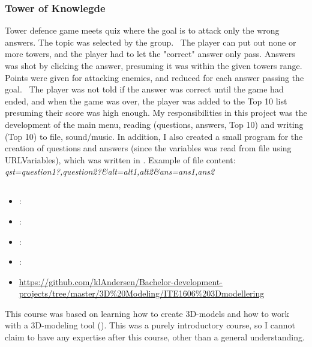 \subsubsection{Tower of Knowlegde}
\label{sec:tower_of_knowledge}
Tower defence game meets quiz where the goal is to attack only the wrong answers. 
The topic was selected by the group. 
The player can put out none or more towers, and the player had to let the "correct" answer only pass.
\vspace{0.5em}\newline
Answers was shot by clicking the answer, presuming it was within the given towers range. 
Points were given for attacking enemies, and reduced for each answer passing the goal. 
The player was not told if the answer was correct until the game had ended, and when the game was over, the player was added to the Top 10 list presuming their score was high enough. 
My responsibilities in this project was the development of the main menu, reading (questions, answers, Top 10) and writing (Top 10) to file, sound/music.
\vspace{0.5em}\newline
In addition, I also created a small program for the creation of questions and answers (since the variables was read from file using URLVariables), which was written in .
\vspace{0.5em}\newline
Example of file content: \\
\textit{qst=question1?,question2?\&alt=alt1,alt2\&ans=ans1,ans2}

\subsection[3D Modelling]{}
\label{sec:ite1606_3d_modelling}
\begin{itemize} 
	\item {}: 
	\item {}: 
	\item {}: 
	\item {}: 
	\item {} \url{https://github.com/klAndersen/Bachelor-development-projects/tree/master/3D%20Modeling/ITE1606%203Dmodellering}
\end{itemize} 
This course was based on learning how to create 3D-models and how to work with a 3D-modeling tool (). 
This was a purely introductory course, so I cannot claim to have any expertise after this course, other than a general understanding.

